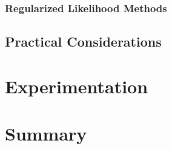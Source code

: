 \subsubsection{Regularized Likelihood Methods}
\label{sss,relax,meth,est,rls}


\subsection{Practical Considerations}
\label{ss,relax,meth,pract}

\section{Experimentation}
\label{s,relax,exp}

\section{Summary}
\label{s,relax,summ}

